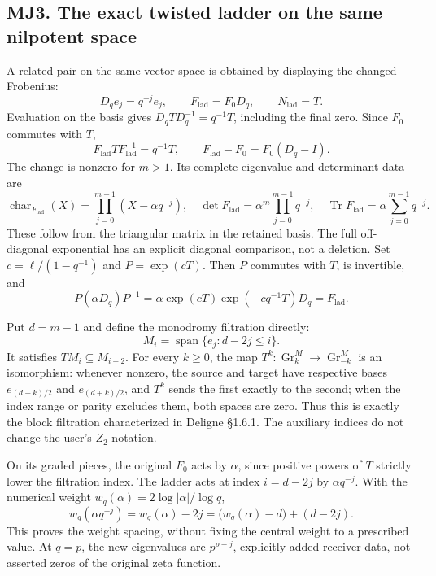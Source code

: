 \subsection{MJ3. The exact twisted ladder on the same nilpotent
space}\label{mj3.-the-exact-twisted-ladder-on-the-same-nilpotent-space}

A related pair on the same vector space is obtained by displaying the
changed Frobenius: \[
D_qe_j=q^{-j}e_j,\qquad F_{\mathrm{lad}}=F_0D_q,\qquad N_{\mathrm{lad}}=T.
\tag{MJ3.1}
\] Evaluation on the basis gives \(D_qTD_q^{-1}=q^{-1}T\), including the
final zero. Since \(F_0\) commutes with \(T\), \[
F_{\mathrm{lad}}TF_{\mathrm{lad}}^{-1}=q^{-1}T,
\qquad F_{\mathrm{lad}}-F_0=F_0(D_q-I).
\tag{MJ3.2}
\] The change is nonzero for \(m>1\). Its complete eigenvalue and
determinant data are \[
\operatorname{char}_{F_{\mathrm{lad}}}(X)=\prod_{j=0}^{m-1}(X-\alpha q^{-j}),
\quad\det F_{\mathrm{lad}}=\alpha^m\prod_{j=0}^{m-1}q^{-j},
\quad\operatorname{Tr}F_{\mathrm{lad}}=\alpha\sum_{j=0}^{m-1}q^{-j}.
\tag{MJ3.3}
\] These follow from the triangular matrix in the retained basis. The
full off-diagonal exponential has an explicit diagonal comparison, not a
deletion. Set \(c=\ell/(1-q^{-1})\) and \(P=\exp(cT)\). Then \(P\)
commutes with \(T\), is invertible, and \[
P(\alpha D_q)P^{-1}
=\alpha\exp(cT)\exp(-cq^{-1}T)D_q
=F_{\mathrm{lad}}.
\tag{MJ3.4}
\]

Put \(d=m-1\) and define the monodromy filtration directly: \[
M_i=\operatorname{span}\{e_j:d-2j\le i\}.
\tag{MJ3.5}
\] It satisfies \(TM_i\subseteq M_{i-2}\). For every \(k\ge0\), the map
\(T^k:\operatorname{Gr}_k^M\to\operatorname{Gr}_{-k}^M\) is an
isomorphism: whenever nonzero, the source and target have respective
bases \(e_{(d-k)/2}\) and \(e_{(d+k)/2}\), and \(T^k\) sends the first
exactly to the second; when the index range or parity excludes them,
both spaces are zero. Thus this is exactly the block filtration
characterized in Deligne §1.6.1. The auxiliary indices do not change the
user's \(Z_2\) notation.

On its graded pieces, the original \(F_0\) acts by \(\alpha\), since
positive powers of \(T\) strictly lower the filtration index. The ladder
acts at index \(i=d-2j\) by \(\alpha q^{-j}\). With the numerical weight
\(w_q(\alpha)=2\log|\alpha|/\log q\), \[
w_q(\alpha q^{-j})=w_q(\alpha)-2j
=\bigl(w_q(\alpha)-d\bigr)+(d-2j).
\tag{MJ3.6}
\] This proves the weight spacing, without fixing the central weight to
a prescribed value. At \(q=p\), the new eigenvalues are \(p^{\rho-j}\),
explicitly added receiver data, not asserted zeros of the original zeta
function.

